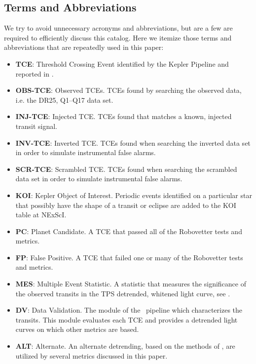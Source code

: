 \subsection{Terms and Abbreviations}
\label{abbrev}
We try to avoid unnecessary acronyms and abbreviations, but are a few are required to efficiently discuss this catalog.  Here we itemize those terms and abbreviations that are repeatedly used in this paper:

\begin{itemize}
\item[] \textbf{TCE}: Threshold Crossing Event identified by the Kepler Pipeline and reported in \citet{Twicken2016}.
\item[] \textbf{OBS-TCE}: Observed TCEs. TCEs found by searching the observed data, i.e. the DR25, Q1--Q17 data set.
\item[] \textbf{INJ-TCE}: Injected TCE. TCEs found that matches a known, injected transit signal.
\item[] \textbf{INV-TCE}: Inverted TCE. TCEs found when searching the inverted data set in order to simulate instrumental false alarms.
\item[] \textbf{SCR-TCE}: Scrambled TCE. TCEs found when searching the scrambled data set in order to simulate instrumental false alarms.
\item[] \textbf{KOI}: Kepler Object of Interest. Periodic events identified on a particular star that possibly have the shape of a transit or eclipse are added to the KOI table at NExScI. 
\item[] \textbf{PC}: Planet Candidate. A TCE that passed all of the Robovetter tests and metrics.
\item[] \textbf{FP}: False Positive. A TCE that failed one or many of the Robovetter tests and metrics.
\item[] \textbf{MES}: Multiple Event Statistic. A statistic that measures the significance of the observed transits in the TPS detrended, whitened light curve, see \citep{Jenkins2002a}.
\item[] \textbf{DV}: Data Validation. The module of the \Kepler\ pipeline which characterizes the transits. This module evaluates each TCE and provides a detrended light curves on which other metrics are based.
\item[] \textbf{ALT}: Alternate. An alternate detrending, based on the methods of \citet{Garcia2010}, are utilized by several metrics discussed in this paper.

\end{itemize}

